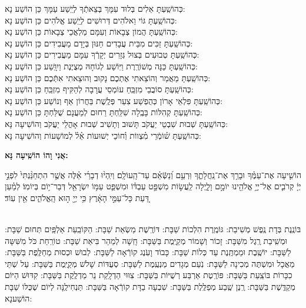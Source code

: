 \documentclass[twoside, openany, parskip=half, 11pt]{book}
\begin{document}
\begin{small}
 כְּהוֹשַֽׁעְתָּ אֵלִים בְּלוּד עִמָּךְ בְּצֵאתְֿךָ לְיֵֽשַׁע עַמָּךְ 	\hfill	כֵּן הוֹשַׁע נָא: \\
כְּהוֹשַֽׁעְתָּ גּוֹי וֵאלֹהִים דְּרוּשִׁים לְיֵֽשַׁע אֱלֹהִים 		\hfill	כֵּן הוֹשַׁע נָא: \\
כְּהוֹשַֽׁעְתָּ הֲמוֹן צְבָאוֹת וְעִמָּם מַלְאֲכֵי צְבָאוֹת 		\hfill	כֵּן הוֹשַׁע נָא: \\
כְּהוֹשַֽׁעְתָּ זַכִּים מִבֵּית עֲבָדִים חַנּוּן בְּיָדָם מַעֲבִידִים 	\hfill	כֵּן הוֹשַׁע נָא: \\
כְּהוֹשַֽׁעְתָּ טְבוּעִים בְּצוּל גְּזָרִים יְקָרְֿךָ עִמָּם מַעֲבִירִים 	\hfill	כֵּן הוֹשַׁע נָא: \\
כְּהוֹשַֽׁעְתָּ כַּנָּה מְשׁוֹרֶֽרֶת וַיּֽוֹשַׁע לְגוֹחָהּ מְצֻיֶּנֶת וַיִוָּֽשַׁע 	\hfill	כֵּן הוֹשַׁע נָא: \\
כְּהוֹשַֽׁעְתָּ מַאֲמַר וְהוֹצֵאתִי אֶתְכֶם נָקוּב וְהוּצֵאתִי אִתְּֿכֶם \hfill	כֵּן הוֹשַׁע נָא:\\
כְּהוֹשַֽׁעְתָּ סוֹבֲבֵי מִזְבֵּֽחַ עוֹמְסֵי עֲרָבָה לְהַקִּיף מִזְבֵּֽחַ 	\hfill	 כֵּן הוֹשַׁע נָא: \\
כְּהוֹשַֽׁעְתָּ פִּלְאֵי אָרוֹן כְּהֻפְשַׁע צִעֵר פְּלֶֽשֶׁת בַּחֲרוֹן אַף וְנוֹשַׁע \hfill 	 כֵּן הוֹשַׁע נָא:\\
כְּהוֹשַֽׁעְתָּ קְהִלּוֹת בָּבֶֽלָה שִׁלַּֽחְתָּ רַחוּם לְמַעֲנָם שֻׁלַּחְתָּ 	\hfill	 כֵּן הוֹשַׁע נָא:\\

כְּהוֹשַֽׁעְתָּ שְׁבוּת שִׁבְטֵי יַעֲקֹב תָּשׁוּב וְתָשִׁיב שְׁבוּת אָהֳלֵי יַעֲקֹב \hfill וְהוֹשִׁיעָה נָּא:\\
 כְּהוֹשַֽׁעְתָּ שׁ֗וֹמְֿרֵי מִ֗צְווֹת וְ֗חוֹכֵי יְשׁוּעוֹת אֵ֗ל֗ לְמוֹשָׁעוֹת \hfill וְהוֹשִׁיעָה נָּא:

\end{small}

\begin{large}
\textbf{אֲנִי וָהוֹ הוֹשִֽׁיעָה נָּא:}
\end{large}

הוֹשִׁ֤יעָה אֶת־עַמֶּ֗ךָ וּבָרֵ֥ךְ אֶת־נַֽחֲלָתֶ֑ךָ וּֽרְעֵ֥ם וְ֝נַשְּֿׂאֵ֗ם עַד־הָֽעוֹלָֽם׃ וְיִֽהְי֨וּ דְבָרַ֜י אֵ֗לֶּה אֲשֶׁ֤ר הִתְחַנַּ֨נְתִּי֙ לִפְנֵ֣י יְיָ֔ קְרֹבִ֛ים אֶל־יְיָ֥ אֱלֹהֵ֖ינוּ יוֹמָ֣ם וָלָ֑יְלָה לַֽעֲשׂ֣וֹת מִשְׁפַּ֣ט עַבְדּ֗וֹ וּמִשְׁפַּ֛ט עַמּ֥וֹ יִשְׂרָאֵ֖ל דְּבַר־י֥וֹם בְּיוֹמֽוֹ׃ לְמַ֗עַן דַּ֚עַת כָּל־עַמֵּ֣י הָאָ֔רֶץ כִּ֥י יְיָ֖ ה֣וּא הָֽאֱלֹהִ֑ים אֵ֖ין עֽוֹד׃

\sepline

\\
 בּוֹנֶֽנֶת בְּדָת נֶֽפֶשׁ מְשִׁיבַת: גּוֹמֶֽרֶת הִלְכוֹת שַׁבָּת: דּוֹרֶֽשֶׁת מַשְׂאַת שַׁבָּת: הַקּוֹבַֽעַת אַלְפַּֽיִם תְּחוּם שַׁבָּת: וּמְשִֽׁיבַת רֶֽגֶל מִשַּׁבָּת: זָכוֹר וְשָׁמוֹר מְקַיֶּֽמֶת בַּשַּׁבָּת: חָֽשָׁה לְמַהֵר בִּיאַת שַׁבָּת: טוֹרַֽחַת כֹּל מִשִּׁשָּה לַשַּׁבָּת: יוֹשֶֽׁבֶת וּמַמְתֶּֽנֶת עַד כְּלוֹת שַׁבָּת: כָּבוֹד וָעֹֽנֶג קוֹרְֿאָה לַשַּׁבָּת: לְבוּשׁ וּכְסוּת מְחַלֶּֽפֶת בַּשַּׁבָּת: מַאֲכָל וּמִשְׁתֶּה מְכִינָה לַשַּׁבָּת: נֹֽעַם מְגָדִים מַנְעֶֽמֶת לַשַּׁבָּת: סְעֻדּוֹת שָׁלֹשׁ מְקַיֶּֽמֶת בַּשַּׁבָּת: עַל שְׁתֵּי כִכָּרוֹת בּוֹצַֽעַת בַּשַּׁבָּת: פּוֹרֶֽטֶת אַרְבַּע רְשֻׁיּוֹת בַּשַּׁבָּת: צִוּוּי הַדְלָֽקַת נֵר מַדְלֶֽקֶת בַּשַּׁבָּת: קִדּוּשׁ הַיּוֹם מְקַדֶּֽשֶׁת בַּשַּׁבָּת: רֶֽנֶן שֶֽׁבַע מְפַלֶּֽלֶת בַּשַּׁבָּת: שִׁבְעָה בַדָּת קוֹרְֿאָה בַּשַּׁבָּת: תַּנְחִילֶֽנָּה לְיוֹם שֶׁכֻּלּוֹ שַׁבָּת הוֹשַׁענָא:
\end{document}
